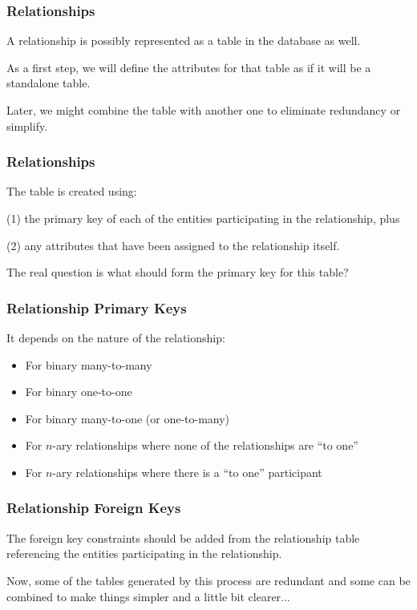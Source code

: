 \begin{frame}
\frametitle{Relationships}

A relationship is possibly represented as a table in the database as well. 

As a first step, we will define the attributes for that table as if it will be a standalone table. 

Later, we might combine the table with another one to eliminate redundancy or simplify.


\end{frame}



\begin{frame}
\frametitle{Relationships}

The table is created using:


(1) the primary key of each of the entities participating in the relationship, plus 

(2) any attributes that have been assigned to the relationship itself. 

The real question is what should form the primary key for this table?

\end{frame}


\begin{frame}
\frametitle{Relationship Primary Keys}

It depends on the nature of the relationship:

\begin{itemize}
	\item For binary many-to-many
	\item For binary one-to-one	
	\item For binary many-to-one (or one-to-many)
	\item For $n$-ary relationships where none of the relationships are ``to one''	
	\item For $n$-ary relationships where there is a ``to one'' participant
\end{itemize}

\end{frame}



\begin{frame}
\frametitle{Relationship Foreign Keys}

The foreign key constraints should be added from the relationship table referencing the entities participating in the relationship. 

Now, some of the tables generated by this process are redundant and some can be combined to make things simpler and a little bit clearer...


\end{frame}




